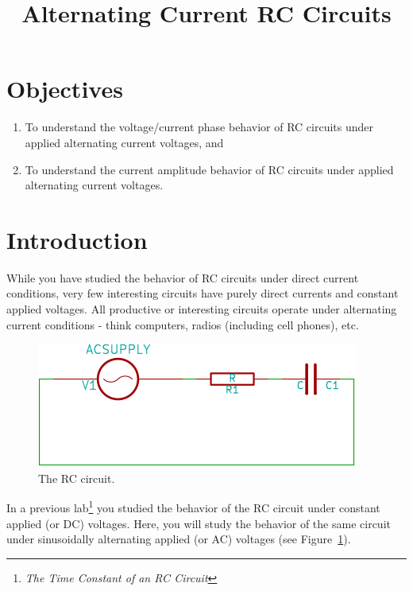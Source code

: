 \documentclass[12pt]{article}
\title{Alternating Current RC Circuits}
\author{}
\date{}
\begin{document}
\maketitle

\section{Objectives}
\label{sec:objectives}

\begin{enumerate}
\item To understand the voltage/current phase behavior of RC circuits
  under applied alternating current voltages, and
\item To understand the current amplitude behavior of RC circuits
  under applied alternating current voltages.
\end{enumerate}

\section{Introduction}
\label{sec:introduction}

While you have studied the behavior of RC circuits under direct
current conditions, very few interesting circuits have purely direct
currents and constant applied voltages.  All productive or interesting
circuits operate under alternating current conditions - think
computers, radios (including cell phones), etc.

\begin{figure}
  \centering
  \includegraphics[width=2\textwidth/3]{figures/rc-circuit}
  \caption{The RC circuit.}
  \label{fig:rccircuit}
\end{figure}
In a previous lab\footnote{\textit{The Time Constant of an RC
    Circuit}} you studied the behavior of the RC circuit under
constant applied (or DC) voltages.  Here, you will study the behavior
of the same circuit under sinusoidally alternating applied (or AC)
voltages (see Figure~\ref{fig:rccircuit}).
\end{document}
